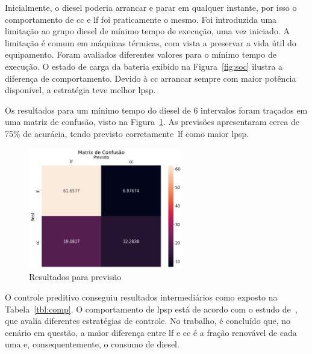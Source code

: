 Inicialmente, o diesel poderia arrancar e parar em qualquer instante, por isso o
comportamento de \acrshort{cc} e \acrshort{lf} foi praticamente o mesmo. Foi
introduzida uma limitação ao grupo diesel de mínimo tempo de execução, uma vez
iniciado. A limitação é comum em máquinas térmicas, com vista a preservar a vida
útil do equipamento. Foram avaliados diferentes valores para o mínimo tempo de
execução.
O estado de carga da bateria exibido na Figura~\ref{fig:soc} ilustra
a diferença de comportamento. Devido à \acrshort{cc} arrancar sempre com maior
potência disponível, a estratégia teve melhor \acrshort{lpsp}.



Os resultados para um mínimo tempo do diesel de 6 intervalos foram traçados em
uma matriz de confusão, visto na Figura~\ref{fig:confusion}. As previsões
apresentaram cerca de 75\% de acurácia, tendo previsto
corretamente~\acrshort{lf} como maior \acrshort{lpsp}.

\begin{figure}[H]
	\centering
	\includegraphics[width=0.6\textwidth]{../img/hm_cc.png}
	\caption{Resultados para previsão}\label{fig:confusion}
\end{figure}

O controle preditivo conseguiu resultados intermediários como exposto na
Tabela~\ref{tbl:comp}.  O comportamento de \acrshort{lpsp} está de acordo com o
estudo de~\cite{das2019performance}, que avalia diferentes estratégias de
controle. No trabalho, é concluído que, no cenário em questão, a maior diferença
entre \acrshort{lf} e \acrshort{cc} é a fração renovável de cada uma e,
consequentemente, o consumo de diesel.



